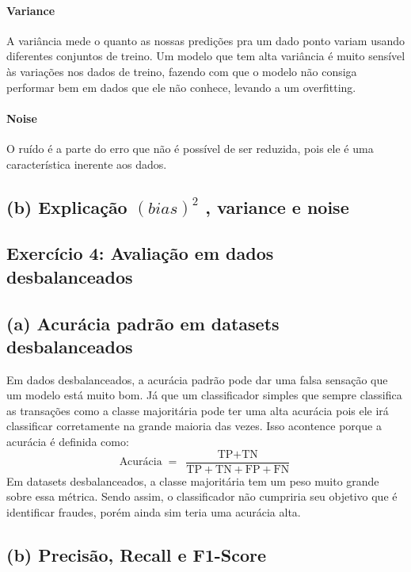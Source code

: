 \documentclass[conference]{IEEEtran}
\begin{document}
\paragraph{Variance}
A variância mede o quanto as nossas predições pra um dado ponto variam usando diferentes conjuntos de treino. Um modelo que tem alta variância é muito sensível às variações nos dados de treino, fazendo com que o modelo não consiga performar bem em dados que ele não conhece, levando a um overfitting.
\paragraph{Noise}
O ruído é a parte do erro que não é possível de ser reduzida, pois ele é uma característica inerente aos dados.
\subsection*{(b) Explicação $(bias) ^ 2$ , variance e noise}
\subsection{Exercício 4: Avaliação em dados desbalanceados}

\subsection*{(a) Acurácia padrão em datasets desbalanceados}
Em dados desbalanceados, a acurácia padrão pode dar uma falsa sensação que um modelo está muito bom. Já que um classificador simples que sempre classifica as transações como a classe majoritária pode ter uma alta acurácia pois ele irá classificar corretamente na grande maioria das vezes. Isso acontence porque a acurácia é definida como:
\[
\text{Acurácia} \;=\;
\frac{\text{TP} + \text{TN}}{\text{TP} + \text{TN} + \text{FP} + \text{FN}}
\]
Em datasets desbalanceados, a classe majoritária tem um peso muito grande sobre essa métrica. Sendo assim, o classificador não cumpriria seu objetivo que é identificar fraudes, porém  ainda sim teria uma acurácia alta.

\subsection*{(b) Precisão, Recall e F1-Score}
\end{document}

